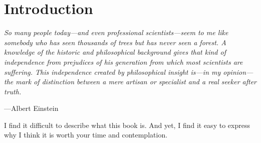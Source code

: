

\part*{Introduction}

\vspace{4mm}
\begin{displayquote}
    \textit{So many people today---and even professional scientists---seem to me like somebody who has seen thousands of trees but has never seen a forest. A knowledge of the historic and philosophical background gives that kind of independence from prejudices of his generation from which most scientists are suffering. This independence created by philosophical insight is---in my opinion---the mark of distinction between a mere artisan or specialist and a real seeker after truth.}
    \vspace{2mm}
    \begin{flushright}
	---Albert Einstein
    \end{flushright}
\end{displayquote}
\vspace{4mm}



I find it difficult to describe what this book is. And yet, I find it easy to express why I think it is worth your time and contemplation.



